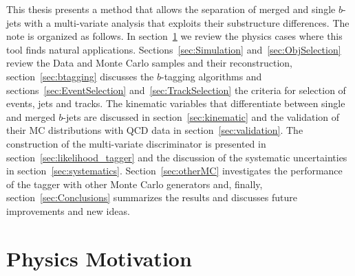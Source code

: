 This thesis presents a method that allows the separation of merged and single $b$-jets with a multi-variate analysis that exploits their substructure differences. The note is organized as follows. In section~\ref{sec:motivation} we review the physics cases where this tool finds natural applications. Sections~\ref{sec:Simulation} and~\ref{sec:ObjSelection} review the Data and Monte Carlo samples and their reconstruction, section~\ref{sec:btagging} discusses the $b$-tagging algorithms and sections~\ref{sec:EventSelection} and~\ref{sec:TrackSelection} the criteria for selection of events, jets and tracks. The kinematic variables that differentiate between single and merged $b$-jets are discussed in section~\ref{sec:kinematic} and the validation of their MC distributions with QCD data in section~\ref{sec:validation}.  The construction of the multi-variate discriminator is presented in section~\ref{sec:likelihood_tagger} and the discussion of the systematic uncertainties in section~\ref{sec:systematics}. Section~\ref{sec:otherMC} investigates the performance of the tagger with other Monte Carlo generators and, finally, section~\ref{sec:Conclusions} summarizes the results and discusses future improvements and new ideas. %

\section{Physics Motivation}\label{sec:motivation}


